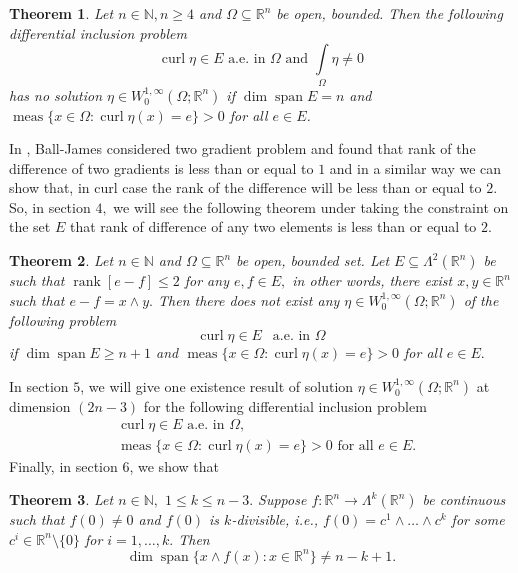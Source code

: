 \documentclass[11pt, a4paper, reqno]{amsart}
\numberwithin{equation}{section}
\newcommand{\spann}{\operatorname{span}}
\newcommand{\meas}{\operatorname{meas}}
\newcommand{\rank}{\operatorname{rank}}
\newcommand{\curl}{\operatorname{curl}}
\newtheorem{theorem}{Theorem}[section]
\begin{document}
\begin{theorem}
Let $n\in \mathbb N, n\geq 4$ and $\Omega \subseteq \mathbb R^n$ be open, bounded. Then the following differential inclusion problem 
\begin{equation*}
    \curl \eta \in E \textrm{ a.e.  in }\Omega \textrm{ and } \displaystyle \int\limits_{\Omega }\eta\neq 0
\end{equation*}
 has no solution $\eta \in W_{0}^{1,\infty}(\Omega;\mathbb R^n)$ if  $\dim \spann E=n$  and $\meas \{x\in \Omega: \curl \eta(x)=e\}>0$ for all $e\in E$.
\end{theorem}
In \cite{ball1987fine}, Ball-James considered two gradient problem and found that rank of the difference of two gradients is less than or equal to $1$ and in a similar way we can show that, in curl case the rank of the difference will be less than or equal to $2$. So, in section $4,$ we will see the following theorem under taking the constraint on the set $E$ that rank of difference of any two elements is less than or equal to $2.$
\begin{theorem}
Let $n\in \mathbb N$ and $\Omega \subseteq \mathbb R^n$ be open, bounded set. Let $E\subseteq \Lambda^2(\mathbb R^n)$ be such that $\rank[e-f]\leq 2$ for any $e,f\in E,$ in other words, there exist $x,y\in \mathbb R^n$ such that $e-f=x\wedge y.$ Then there does not exist any $\eta\in W_{0}^{1,\infty}(\Omega;\mathbb R^n)$ of the following problem 
\begin{equation*}
    \curl \eta \in E \ \ \textrm{ a.e. in } \Omega
\end{equation*}
if $\dim\spann E\geq n+1$ and $\meas\{x\in \Omega :\curl \eta(x)=e\}>0$ for all $e\in E.$
\end{theorem}
In section $5$, we will give one existence result of solution $\eta \in W_0^{1,\infty}(\Omega;\mathbb R^n)$ at dimension $(2n-3)$ for the following differential inclusion problem 
\begin{align*}
&\curl \eta\in E \textrm{ a.e. in }\Omega,\\
&\meas\{x\in \Omega:\curl \eta (x)=e\}>0 \textrm{ for all } e\in E.
\end{align*}
Finally, in section $6$, we show that
\begin{theorem}
Let $n\in \mathbb N,$ $1\leq k \leq n-3.$ Suppose $f:\mathbb R^n\to \Lambda^k(\mathbb R^n)$ be  continuous such that $f(0)\neq 0$ and $f(0)$ is $k$-divisible, i.e., $f(0)=c^1\wedge \ldots \wedge c^k$ for some $c^i\in \mathbb R^n\setminus \{0\}$ for  $i=1,\ldots, k.$ Then 
\begin{equation}\nonumber
\dim \spann \{x\wedge f(x): x\in \mathbb R^n\}\neq n-k+1.
\end{equation}

\end{theorem}
\end{document}
